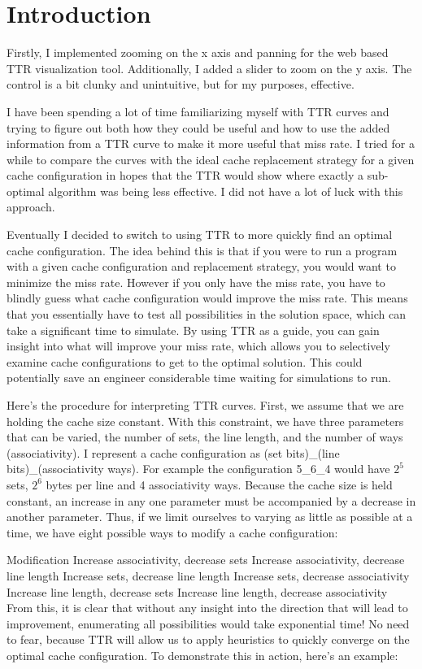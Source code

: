 \section{Introduction}
Firstly, I implemented zooming on the x axis and panning for the web based TTR visualization tool. Additionally, I added a slider to zoom on the y axis. The control is a bit clunky and unintuitive, but for my purposes, effective.

I have been spending a lot of time familiarizing myself with TTR curves and trying to figure out both how they could be useful and how to use the added information from a TTR curve to make it more useful that miss rate. I tried for a while to compare the curves with the ideal cache replacement strategy for a given cache configuration in hopes that the TTR would show where exactly a sub-optimal algorithm was being less effective. I did not have a lot of luck with this approach.

Eventually I decided to switch to using TTR to more quickly find an optimal cache configuration. The idea behind this is that if you were to run a program with a given cache configuration and replacement strategy, you would want to minimize the miss rate. However if you only have the miss rate, you have to blindly guess what cache configuration would improve the miss rate. This means that you essentially have to test all possibilities in the solution space, which can take a significant time to simulate. By using TTR as a guide, you can gain insight into what will improve your miss rate, which allows you to selectively examine cache configurations to get to the optimal solution. This could potentially save an engineer considerable time waiting for simulations to run.

Here's the procedure for interpreting TTR curves. First, we assume that we are holding the cache size constant. With this constraint, we have three parameters that can be varied, the number of sets, the line length, and the number of ways (associativity). I represent a cache configuration as (set bits)\_(line bits)\_(associativity ways). For example the configuration 
5\_6\_4 
would have $2^5$ sets, $2^6$ bytes per line and 4 associativity ways. Because the cache size is held constant, an increase in any one parameter must be accompanied by a decrease in another parameter. Thus, if we limit ourselves to varying as little as possible at a time, we have eight possible ways to modify a cache configuration:

Modification
Increase associativity, decrease sets
Increase associativity, decrease line length
Increase sets, decrease line length
Increase sets, decrease associativity
Increase line length, decrease sets
Increase line length, decrease associativity
From this, it is clear that without any insight into the direction that will lead to improvement, enumerating all possibilities would take exponential time! No need to fear, because TTR will allow us to apply heuristics to quickly converge on the optimal cache configuration. To demonstrate this in action, here's an example:

